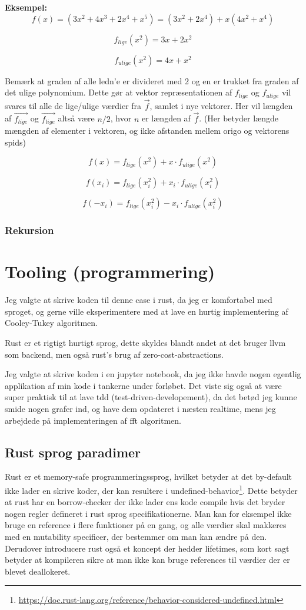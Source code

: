 \documentclass[11pt,a4paper]{article}
\begin{document}
\textbf{Eksempel:}
$$
f(x) = (3x^2 + 4x^3 + 2x^4 + x^5) = (3x^2 + 2x^4) + x(4x^2 + x^4)
$$

$$
f_{lige}(x^2) = 3x + 2x^2
$$

$$
f_{ulige}(x^2) = 4x + x^2
$$

Bemærk at graden af alle ledn'e er divideret med 2 og en er trukket fra graden af det ulige polynomium.
Dette gør at vektor repræsentationen af \(f_{lige}\) og \(f_{ulige}\) vil svares til alle de lige/ulige værdier fra \(\vec{f}\),
samlet i nye vektorer. Her vil længden af \({\vec{f_{lige}}}\) og \({\vec{f_{lige}}}\) altså være \(n/2\), hvor \(n\) er længden af \(\vec{f}\).
(Her betyder længde mængden af elementer i vektoren, og ikke afstanden mellem origo og vektorens spids)

$$
f(x) = f_{lige}(x^2) + x \cdot f_{ulige}(x^2)
$$

$$
f(x_i) = f_{lige}(x^2_i) + x_i \cdot f_{ulige}(x^2_i)
$$

$$
f(-x_i) = f_{lige}(x^2_i) - x_i \cdot f_{ulige}(x^2_i)
$$

\subsubsection{Rekursion}
\label{sec:orgc637dcd}

\section{Tooling (programmering)}
\label{sec:org61f8cf4}
Jeg valgte at skrive koden til denne case i rust, da jeg er komfortabel med sproget,
og gerne ville eksperimentere med at lave en hurtig implementering af Cooley-Tukey algoritmen.

Rust er et rigtigt hurtigt sprog, dette skyldes blandt andet at det bruger llvm som backend,
men også rust's brug af zero-cost-abstractions.

Jeg valgte at skrive koden i en jupyter notebook, da jeg ikke havde nogen egentlig
applikation af min kode i tankerne under forløbet.
Det viste sig også at være super praktisk til at lave tdd (test-driven-developement),
da det betød jeg kunne smide nogen grafer ind, og have dem opdateret i næsten realtime,
mens jeg arbejdede på implementeringen af fft algoritmen.

\subsection{Rust sprog paradimer}
\label{sec:org2480af4}
Rust er et memory-safe programmeringssprog,
hvilket betyder at det by-default ikke lader en skrive koder, der kan resultere i undefined-behavior\footnote{\url{https://doc.rust-lang.org/reference/behavior-considered-undefined.html}}.
Dette betyder at rust har en borrow-checker der ikke lader ens kode compile hvis det bryder nogen regler defineret i rust sprog specifikationerne.
Man kan for eksempel ikke bruge en reference i flere funktioner på en gang, og alle værdier skal makkeres med
en mutability specificer, der bestemmer om man kan ændre på den. Derudover introducere rust også et koncept der hedder lifetimes,
som kort sagt betyder at kompileren sikre at man ikke kan bruge references til værdier der er blevet deallokeret.
\end{document}
